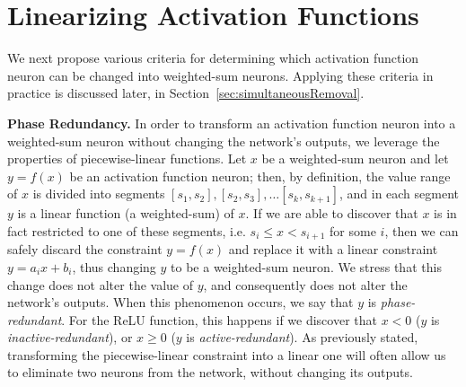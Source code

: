 \documentclass[10pt, conference, twocolumn, compsocconf]{IEEEtran}
\theoremstyle{remark}
\newcommand{\relu}{\text{ReLU}\xspace}
\begin{document}


\section{Linearizing Activation Functions}
\label{sec:linear_funcs}
We next propose various criteria for determining which activation
function neuron can be changed into weighted-sum neurons. Applying
these criteria in practice is discussed later, in
Section~\ref{sec:simultaneousRemoval}.

\medskip
\noindent
\textbf{Phase Redundancy.}  In order to transform an activation
function neuron into a weighted-sum neuron
without changing the network's outputs, we leverage the properties of
piecewise-linear functions. Let $x$ be a weighted-sum neuron
and let $y=f(x)$ be an activation function neuron; then, by
definition, the value range of $x$ is divided into segments
$[s_1,s_2], [s_2,s_3], \ldots [s_k,s_{k+1}]$, and in each segment $y$
is a linear function (a weighted-sum) of $x$.  If we are able to
discover that $x$ is in fact restricted to one of these segments, i.e.
$s_i\leq x< s_{i+1}$ for some $i$, then we can safely discard the
constraint $y=f(x)$ and replace it with a linear constraint
$y=a_ix+b_i$, thus changing $y$ to be a weighted-sum neuron. We stress
that this change does not alter the value of $y$, and consequently
does not alter the network's outputs. When this phenomenon occurs, we
say that $y$ is \emph{phase-redundant}.  For the ReLU function, this
happens if we discover that $x< 0$ ($y$ is
\emph{inactive-redundant}), or $x\geq 0$ ($y$ is
\emph{active-redundant}). As previously stated, transforming the
piecewise-linear constraint into a linear one will often allow us to
eliminate two neurons from the network, without changing its outputs.
\end{document}

